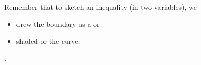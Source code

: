 \noindent
Remember that to sketch an inequality (in two variables), we 
\begin{itemize}[itemsep=0in]
    \item drew the boundary as a  or 
    \item shaded  or  the curve.
\end{itemize}.

\begin{center}
\end{center}
\begin{center}
\end{center}
